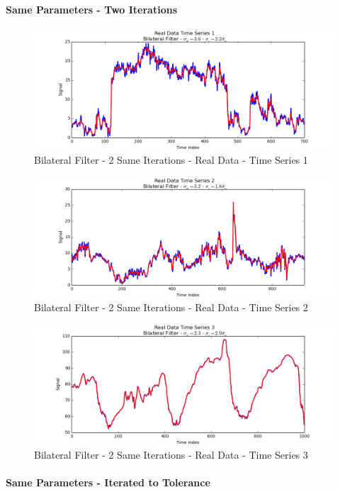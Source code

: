 \documentclass[11pt]{article}
\theoremstyle{definition}
\begin{document}
\paragraph{Same Parameters - Two Iterations}

\begin{figure}
\centering
\includegraphics[width = 0.75 \textwidth]{2SameBilateralRealSignal1.png}
\caption{Bilateral Filter - 2 Same Iterations - Real Data - Time Series 1}
\label{2samebilateralrealsignal1}
\end{figure}

\begin{figure}
\centering
\includegraphics[width = 0.75 \textwidth]{2SameBilateralRealSignal2.png}
\caption{Bilateral Filter - 2 Same Iterations - Real Data - Time Series 2}
\label{2samebilateralrealsignal2}
\end{figure}

\begin{figure}
\centering
\includegraphics[width = 0.75 \textwidth]{2SameBilateralRealSignal3.png}
\caption{Bilateral Filter - 2 Same Iterations - Real Data - Time Series 3}
\label{2samebilateralrealsignal3}
\end{figure}

\newpage

\paragraph{Same Parameters - Iterated to Tolerance}
\end{document}
